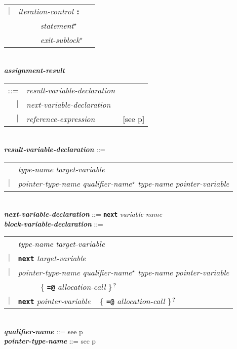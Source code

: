 \documentclass[12pt]{article}
\newcommand{\TT}[1]{{\tt \bfseries #1}}
\newcommand{\STAR}{{\Large $^\star$}}
\newcommand{\QMARK}{{$^{\,\mbox{\footnotesize ?}}$}}
\newcommand{\ttkey}[1]{{\tt \bfseries #1}}
\newcommand{\emkey}[1]{{\em \bfseries #1}}
\newcommand{\pagref}[1]{p\pageref{#1}}
\newenvironment{indpar}[1][0.3in]%
	{\begin{list}{}%
		     {\setlength{\itemsep}{0in}%
		      \setlength{\topsep}{0in}%
		      \setlength{\parsep}{1ex}%
		      \setlength{\labelwidth}{#1}%
		      \setlength{\leftmargin}{#1}%
		      \addtolength{\leftmargin}{\labelsep}}%
	 \item}%
	{\end{list}}
\begin{document}
\begin{indpar}
\begin{tabular}[t]{@{}rll}
    $|$ & {\em iteration-control} \TT{:} \\
        & ~~~~~ {\em statement}\STAR{} \\
        & ~~~~~ {\em exit-sublock}\STAR{} \\
    \end{tabular}
\\[0.5ex]
\emkey{assignment-result}\label{ASSIGNMENT-RESULT}
    \begin{tabular}[t]{@{}rll}
    ::= & {\em result-variable-declaration} \\
    $|$ & {\em next-variable-declaration} \\
    $|$ & {\em reference-expression}
    		& [see \pagref{REFERENCE-EXPRESSIONS}] \\
    \end{tabular}
\\[0.5ex]
\emkey{result-variable-declaration}\label{RESULT-VARIABLE-DECLARATION} ::= \\
\hspace*{0.5in}\begin{tabular}{rl}
	    & {\em type-name} {\em target-variable} \\
	$|$ & {\em pointer-type-name} {\em qualifier-name}\STAR{}
	      {\em type-name} {\em pointer-variable}
	\end{tabular}
\\[0.5ex]
\emkey{next-variable-declaration}\label{NEXT-VARIABLE-DECLARATION}
    ::= \ttkey{next} {\em variable-name}
\\[0.5ex]
\emkey{block-variable-declaration}\label{BLOCK-VARIABLE-DECLARATION} ::= \\
\hspace*{0.5in}\begin{tabular}{rl}
	    & {\em type-name} {\em target-variable} \\
	$|$ & \TT{next} {\em target-variable} \\
	$|$ & {\em pointer-type-name} {\em qualifier-name}\STAR{}
	      {\em type-name} {\em pointer-variable} \\
	    & ~~~~~ \{ \TT{=@} {\em allocation-call} \}\QMARK{} \\
	$|$ & \TT{next} {\em pointer-variable}
	      ~ \{ \TT{=@} {\em allocation-call} \}\QMARK{} \\
	\end{tabular}
\\[0.5ex]
\emkey{qualifier-name} ::= see \pagref{QUALIFIER-NAME}
\\[0.5ex]
\emkey{pointer-type-name} ::= see \pagref{POINTER-TYPE-NAME}

\end{indpar}
\end{document}
